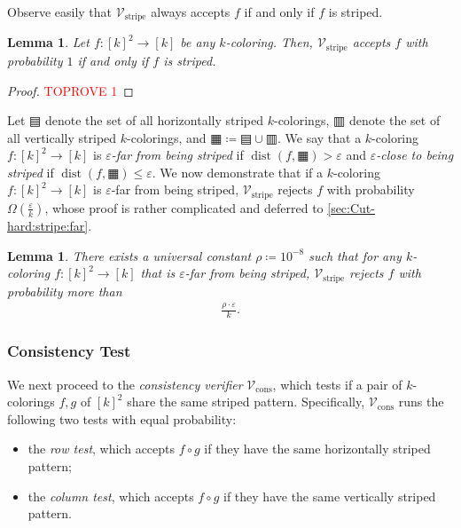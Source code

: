 \documentclass[11pt,fleqn]{article}
\renewcommand{\leq}{\leqslant}
\renewcommand{\epsilon}{\varepsilon}
\newcommand{\defeq}{\coloneq}
\DeclareMathOperator{\rHam}{\mathrm{dist}}
\newcommand{\V}{\calV}
\newcommand{\f}{f}
\newcommand{\g}{g}
\newcommand{\rhozero}{10^{-8}}
\newcommand{\hor}{\squarehfill}
\newcommand{\ver}{\squarevfill}
\newcommand{\str}{\squarehvfill}
\newcommand{\Vstripe}{\V_\mathrm{stripe}}
\newcommand{\Vcons}{\V_\mathrm{cons}}
\newcommand{\calV}{\mathcal{V}}
\newtheorem{lemma}[theorem]{Lemma}
\theoremstyle{definition}
\numberwithin{equation}{section}
\begin{document}
Observe easily that $\Vstripe$ always accepts $f$ if and only if $f$ is striped.


\begin{lemma}
\label{lem:Cut-hard:stripe:striped}
    Let  $\f \colon [k]^2 \to [k]$ be any $k$-coloring.
    Then, $\Vstripe$ accepts $\f$ with probability $1$
    if and only if $\f$ is striped.
\end{lemma}
\begin{proof}\textcolor{red}{TOPROVE 1}\end{proof}


Let $\hor$ denote the set of all horizontally striped $k$-colorings,
$\ver$ denote the set of all vertically striped $k$-colorings, and
$\str \defeq \hor \cup \ver$.
We say that a $k$-coloring $\f \colon [k]^2 \to [k]$ is
\emph{$\epsilon$-far from being striped} if $\rHam(\f, \str) > \epsilon$ and
\emph{$\epsilon$-close to being striped} if $\rHam(\f, \str) \leq \epsilon$.
We now demonstrate that if a $k$-coloring $\f \colon [k]^2 \to [k]$ is $\epsilon$-far from being striped,
$\Vstripe$ rejects $\f$ with probability $\Omega\left(\frac{\epsilon}{k}\right)$,
whose proof is rather complicated and deferred to \cref{sec:Cut-hard:stripe:far}.


\begin{lemma} \label{lem:Cut-hard:stripe:far}
    There exists a universal constant $\rho \defeq \rhozero$ such that
    for any $k$-coloring $\f \colon [k]^2 \to [k]$ that is $\epsilon$-far from being striped,
    $\Vstripe$ rejects $\f$ with probability more than
    \begin{align}
        \frac{\rho \cdot \epsilon}{k}.
    \end{align}
\end{lemma}


\subsubsection{Consistency Test}
\label{sec:Cut-hard:tests:cons}


We next proceed to the \emph{consistency verifier} $\Vcons$, which tests
if a pair of $k$-colorings $\f,\g$ of $[k]^2$ share the same striped pattern.
Specifically,
$\Vcons$ runs the following two tests with equal probability:
\begin{itemize}
    \item the \emph{row test},
    which accepts $\f \circ \g$ if
    they have the same horizontally striped pattern;
    \item the \emph{column test},
    which accepts $\f \circ \g$ if
    they have the same vertically striped pattern.
\end{itemize}
\end{document}

